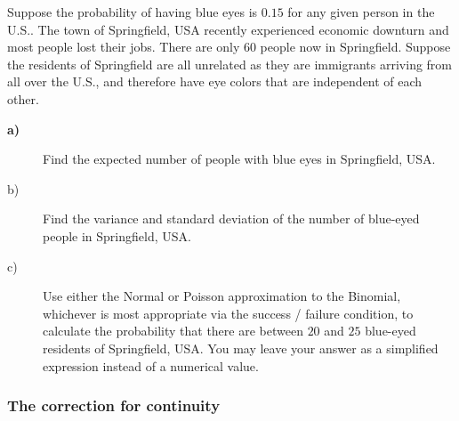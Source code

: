 \begin{Exercise}[label={ExBlueEyedInNewSpringfield}]
Suppose the probability of having blue eyes is $0.15$
for any given person in the U.S.. The town of Springfield, USA recently experienced economic downturn and most people lost their jobs.  There are only $60$ people now in Springfield. 
Suppose the residents of Springfield are all unrelated as they are immigrants arriving from all over the U.S., 
and therefore have eye colors that are independent of each other.

\begin{description}
\item[\textbf{a)}] Find the expected number of people with blue eyes in
Springfield, USA.

\item[b)] Find the variance and standard deviation of the number of
blue-eyed people in Springfield, USA.

\item[c)] Use either the Normal or Poisson approximation to the Binomial, whichever is most appropriate via the success / failure condition, to calculate the
probability that there are between $20$ and $25$ blue-eyed residents of
Springfield, USA. You may leave your answer as a simplified expression instead of a numerical value.
\end{description}
\end{Exercise}

\subsubsection{The correction for continuity}\label{S:CorrectionForContinuity}

